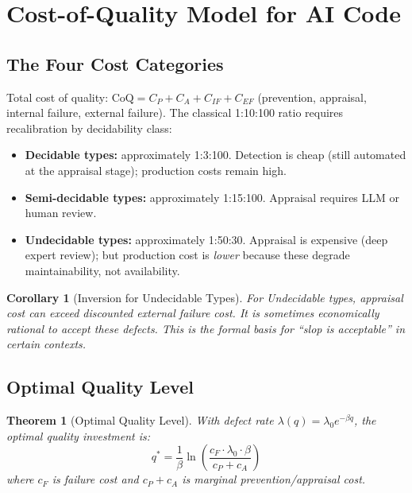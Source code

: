 \documentclass[11pt, a4paper, logo, copyright]{googledeepmind}
\newtheorem{theorem}{Theorem}[section]
\newtheorem{corollary}{Corollary}[section]
\newcommand{\CoQ}{\mathrm{CoQ}}
\begin{document}
\section{Cost-of-Quality Model for AI Code}
\label{sec:coq}

\subsection{The Four Cost Categories}

Total cost of quality: $\CoQ = C_P + C_A + C_{IF} + C_{EF}$ (prevention, appraisal, internal failure, external failure). The classical 1:10:100 ratio requires recalibration by decidability class:

\begin{itemize}
\item \textbf{Decidable types:} approximately 1:3:100. Detection is cheap (still automated at the appraisal stage); production costs remain high.
\item \textbf{Semi-decidable types:} approximately 1:15:100. Appraisal requires LLM or human review.
\item \textbf{Undecidable types:} approximately 1:50:30. Appraisal is expensive (deep expert review); but production cost is \emph{lower} because these degrade maintainability, not availability.
\end{itemize}

\begin{corollary}[Inversion for Undecidable Types]
For Undecidable types, appraisal cost can exceed discounted external failure cost. It is sometimes economically rational to \emph{accept} these defects. This is the formal basis for ``slop is acceptable'' in certain contexts.
\end{corollary}

\subsection{Optimal Quality Level}

\begin{theorem}[Optimal Quality Level]
\label{thm:optquality}
With defect rate $\lambda(q) = \lambda_0 e^{-\beta q}$, the optimal quality investment is:
\begin{equation}
q^* = \frac{1}{\beta} \ln\!\left(\frac{c_F \cdot \lambda_0 \cdot \beta}{c_P + c_A}\right)
\end{equation}
where $c_F$ is failure cost and $c_P + c_A$ is marginal prevention/appraisal cost.
\end{theorem}
\end{document}
